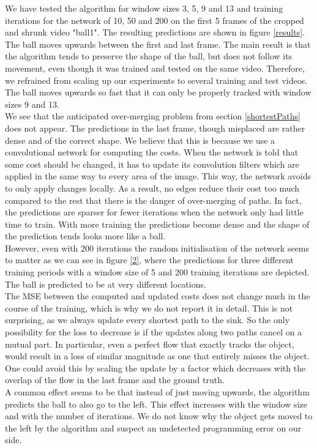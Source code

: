\documentclass{article}
\begin{document}
We have tested the algorithm for window sizes 3, 5, 9 and 13 and training iterations for the network of 10, 50 and 200 on the first 5 frames of the cropped and shrunk video "ball1". The resulting predictions are shown in figure \ref{results}. The ball moves upwards between the first and last frame. The main result is that the algorithm tends to preserve the shape of the ball, but does not follow its movement, even though it was trained and tested on the same video. Therefore, we refrained from scaling up our experiments to several training and test videos. The ball moves upwards so fast that it can only be properly tracked with window sizes 9 and 13.\\
We see that the anticipated over-merging problem from section \ref{shortestPaths} does not appear. The predictions in the last frame, though misplaced are rather dense and of the correct shape. We believe that this is because we use a convolutional network for computing the costs. When the network is told that some cost should be changed, it has to update its convolution filters which are applied in the same way to every area of the image. This way, the network avoids to only apply changes locally. As a result, no edges reduce their cost too much compared to the rest that there is the danger of over-merging of paths. In fact, the predictions are sparser for fewer iterations when the network only had little time to train. With more training the predictions become dense and the shape of the prediction tends looks more like a ball. \\
However, even with 200 iterations the random initialisation of the network seems to matter as we can see in figure \ref{2}, where the predictions for three different training periods with a window size of 5 and 200 training iterations are depicted. The ball is predicted to be at very different locations.\\
The MSE between the computed and updated costs does not change much in the course of the training, which is why we do not report it in detail. This is not surprising, as we always update every shortest path to the sink. So the only possibility for the loss to decrease is if the updates along two paths cancel on a mutual part. In particular, even a perfect flow that exactly tracks the object, would result in a loss of similar magnitude as one that entirely misses the object. One could avoid this by scaling the update by a factor which decreases with the overlap of the flow in the last frame and the ground truth.\\
A common effect seems to be that instead of just moving upwards, the algorithm predicts the ball to also go to the left. This effect increases with the window size and with the number of iterations. We do not know why the object gets moved to the left by the algorithm and suspect an undetected programming error on our side.\\
\end{document}
